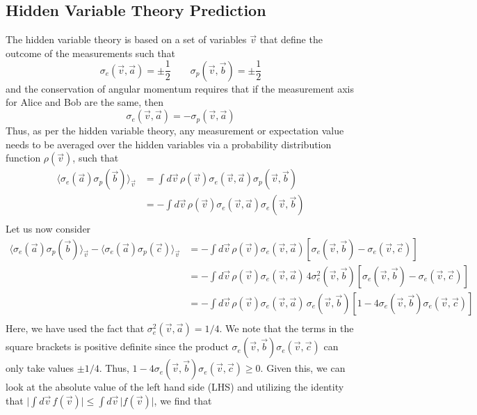 \documentclass[aps,prb,onecolumn,notitlepage,showpacs,floatfix,superscriptaddress]{revtex4-1}
\begin{document}
\subsection{Hidden Variable Theory Prediction}
The hidden variable theory is based on a set of variables $\vec{v}$ that define the outcome of the measurements such that
\begin{equation}
\sigma_e(\vec{v},\vec{a}) = \pm \dfrac{1}{2} \qquad \sigma_p(\vec{v},\vec{b}) = \pm \dfrac{1}{2} 
\end{equation}
and the conservation of angular momentum requires that if the measurement axis for Alice and Bob are the same, then
\begin{equation}
\sigma_e(\vec{v},\vec{a}) = - \sigma_p(\vec{v},\vec{a})
\end{equation}
Thus, as per the hidden variable theory, any measurement or expectation value needs to be averaged over the hidden variables via a probability distribution function $\rho(\vec{v})$, such that
\begin{equation}
\begin{split}
\langle \sigma_e(\vec{a}) \sigma_p(\vec{b}) \rangle_{\vec{v}} &= \int d\vec{v} \, \rho(\vec{v}) \sigma_e(\vec{v},\vec{a}) \sigma_p(\vec{v},\vec{b}) \\
&= -\int d\vec{v} \, \rho(\vec{v}) \sigma_e(\vec{v},\vec{a}) \sigma_e(\vec{v},\vec{b}) \\
\end{split}
\end{equation}
Let us now consider 
\begin{equation}
\begin{split}
\langle \sigma_e(\vec{a}) \sigma_p(\vec{b}) \rangle_{\vec{v}}-\langle \sigma_e(\vec{a}) \sigma_p(\vec{c}) \rangle_{\vec{v}} &=  -\int d\vec{v} \, \rho(\vec{v}) \sigma_e(\vec{v},\vec{a}) \left[ \sigma_e(\vec{v},\vec{b})-\sigma_e(\vec{v},\vec{c})\right] \\
&=  -\int d\vec{v} \, \rho(\vec{v}) \sigma_e(\vec{v},\vec{a}) \, 4 \sigma_e^2(\vec{v},\vec{b}) \left[ \sigma_e(\vec{v},\vec{b})-\sigma_e(\vec{v},\vec{c})\right] \\
&=  -\int d\vec{v} \, \rho(\vec{v}) \sigma_e(\vec{v},\vec{a}) \, \sigma_e(\vec{v},\vec{b}) \left[1-4\sigma_e(\vec{v},\vec{b}) \sigma_e(\vec{v},\vec{c})\right] \\
\end{split}
\end{equation}
Here, we have used the fact that $\sigma_e^2(\vec{v},\vec{a})=1/4$. We note that the terms in the square brackets is positive definite since the product $\sigma_e(\vec{v},\vec{b}) \sigma_e(\vec{v},\vec{c})$ can only take values $\pm 1/4$. Thus, $1-4\sigma_e(\vec{v},\vec{b}) \sigma_e(\vec{v},\vec{c}) \geq 0$. Given this, we can look at the absolute value of the left hand side (LHS) and utilizing the identity that $\vert \int d\vec{v} \, f(\vec{v}) \vert \leq \int d\vec{v} \, \vert f(\vec{v}) \vert $, we find that
\end{document}
